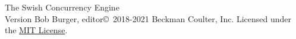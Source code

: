 \documentclass[letterpaper,11pt,twoside,final]{report}
\begin{document}
\begin{sagianbook}{The Swish Concurrency Engine\\
    Version }{Bob Burger,
    editor}{\copyright\ 2018-2021 Beckman Coulter, Inc.
    Licensed under the \href{https://opensource.org/licenses/MIT}{MIT License}.}



\end{sagianbook}
\end{document}
